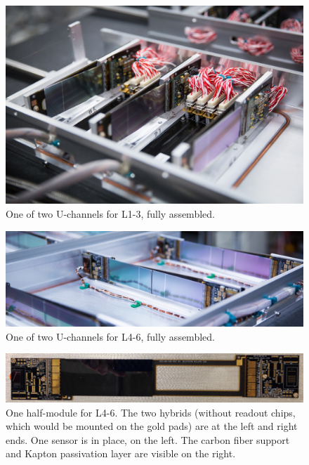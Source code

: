 \begin{figure}[ht]
    \includegraphics[width=\textwidth]{detector/figs/l123}
    \caption{One of two U-channels for L1-3, fully assembled.}
    \label{fig:l123}
\end{figure}

\begin{figure}[ht]
    \includegraphics[width=\textwidth]{detector/figs/l456}
    \caption{One of two U-channels for L4-6, fully assembled.}
    \label{fig:l456}
\end{figure}

\begin{figure}[ht]
    \includegraphics[width=\textwidth]{detector/figs/l456_hm}
    \caption{One half-module for L4-6. The two hybrids (without readout chips, which would be mounted on the gold pads) are at the left and right ends. One sensor is in place, on the left. The carbon fiber support and Kapton passivation layer are visible on the right.}
    \label{fig:l456_hm}
\end{figure}

